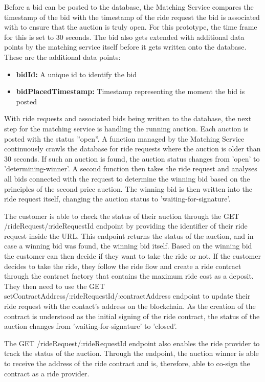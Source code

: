Before a bid can be posted to the database, the Matching Service compares the timestamp of the bid with the timestamp of the ride request the bid is associated with to ensure that the auction is truly open. For this prototype, the time frame for this is set to 30 seconds. The bid also gets extended with additional data points by the matching service itself before it gets written onto the database. These are the additional data points:

\begin{itemize}
    \item \textbf{bidId:} A unique id to identify the bid
    \item \textbf{bidPlacedTimestamp:} Timestamp representing the moment the bid is posted
\end{itemize}

With ride requests and associated bids being written to the database, the next step for the matching service is handling the running auction. Each auction is posted with the status ''open''. A function managed by the Matching Service continuously crawls the database for ride requests where the auction is older than 30 seconds. If such an auction is found, the auction status changes from 'open' to 'determining-winner'. A second function then takes the ride request and analyses all bids connected with the request to determine the winning bid based on the principles of the second price auction. The winning bid is then written into the ride request itself, changing the auction status to 'waiting-for-signature'. 

The customer is able to check the status of their auction through the GET /rideRequest/:rideRequestId endpoint by providing the identifier of their ride request inside the URL. This endpoint returns the status of the auction, and in case a winning bid was found, the winning bid itself. Based on the winning bid the customer can then decide if they want to take the ride or not. If the customer decides to take the ride, they follow the ride flow and create a ride contract through the contract factory that contains the maximum ride cost as a deposit. They then need to use the GET setContractAddress/:rideRequestId/:contractAddress endpoint to update their ride request with the contact's address on the blockchain. As the creation of the contract is understood as the initial signing of the ride contract, the status of the auction changes from 'waiting-for-signature' to 'closed'. 

The GET /rideRequest/:rideRequestId endpoint also enables the ride provider to track the status of the auction. Through the endpoint, the auction winner is able to receive the address of the ride contract and is, therefore, able to co-sign the contract as a ride provider.

